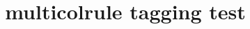 \documentclass{article}
\title{multicolrule tagging test}
\begin{document}
\begin{multicols}{3}
\kant[1-6]
\end{multicols}
\end{document}
